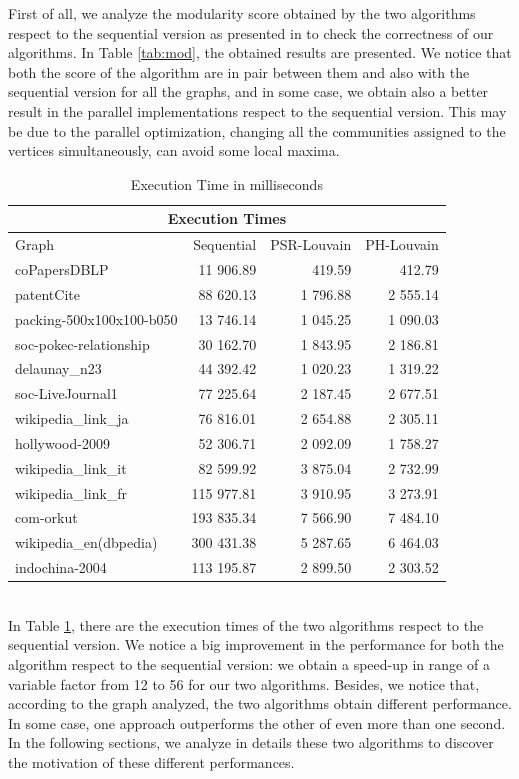 First of all, we analyze the modularity score obtained by the two algorithms respect to the sequential version as presented in \cite{Blondel_2008} to check the correctness of our algorithms. In Table \ref{tab:mod}, the obtained results are presented. We notice that both the score of the algorithm are in pair between them and also with the sequential version for all the graphs, and in some case, we obtain also a better result in the parallel implementations respect to the sequential version. This may be due to the parallel optimization, changing all the communities assigned to the vertices simultaneously, can avoid some local maxima.
\begin{table}
	\centering
	\begin{tabular}{ |l||r||r|r|}
		\hline
		\multicolumn{4}{|c|}{Execution Times} \\
		\hline
		Graph & Sequential & PSR-Louvain & PH-Louvain \\
		\hline
		coPapersDBLP 			&  11 906.89 &   419.59 &  412.79 \\
		patentCite 				&  88 620.13 & 1 796.88 & 2 555.14 \\
		packing-500x100x100-b050&  13 746.14 & 1 045.25 & 1 090.03 \\
		soc-pokec-relationship	&  30 162.70 & 1 843.95 & 2 186.81 \\ 
		delaunay\_n23 			&  44 392.42 & 1 020.23 & 1 319.22 \\
		soc-LiveJournal1 		&  77 225.64 & 2 187.45 & 2 677.51 \\
		wikipedia\_link\_ja 	&  76 816.01 & 2 654.88 & 2 305.11 \\
		hollywood-2009 			&  52 306.71 & 2 092.09 & 1 758.27 \\
		wikipedia\_link\_it 	&  82 599.92 & 3 875.04 & 2 732.99 \\
		wikipedia\_link\_fr 	& 115 977.81 & 3 910.95 & 3 273.91 \\
		com-orkut 				& 193 835.34 & 7 566.90 & 7 484.10 \\
		wikipedia\_en(dbpedia) 	& 300 431.38 & 5 287.65 & 6 464.03 \\
		indochina-2004 			& 113 195.87 & 2 899.50 & 2 303.52 \\
		\hline
	\end{tabular}
	\caption{\label{tab:execution_time}Execution Time in milliseconds}
\end{table} \\
In Table \ref{tab:execution_time}, there are the execution times of the two algorithms respect to the sequential version. We notice a big improvement in the performance for both the algorithm respect to the sequential version: we obtain a speed-up in range of a variable factor from 12 to 56 for our two algorithms. 
Besides, we notice that, according to the graph analyzed, the two algorithms obtain different performance. In some case, one approach outperforms the other of even more than one second. In the following sections, we analyze in details these two algorithms to discover the motivation of these different performances.  
